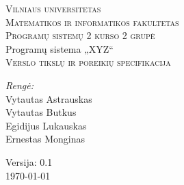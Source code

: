 \begin{titlepage}

  \begin{center}

    \textsc{%
    \Large Vilniaus universitetas\\
    Matematikos ir informatikos fakultetas\\
    Programų sistemų 2 kurso 2 grupė}\\[6.0cm]

    { \huge Programų sistema „XYZ“ }\\[0.5cm]

    \textsc{\Large Verslo tikslų ir poreikių specifikacija }\\[4.0cm]

    \begin{minipage}[]{0.8\textwidth}
      \begin{flushright} \large
        \emph{Rengė:} \\
        Vytautas Astrauskas \\
        Vytautas Butkus \\
        Egidijus Lukauskas \\
        Ernestas Monginas
      \end{flushright}
    \end{minipage}

    \vfill

    {\large  Versija: 0.1 \\ \today }
  \end{center}
  
\end{titlepage}

